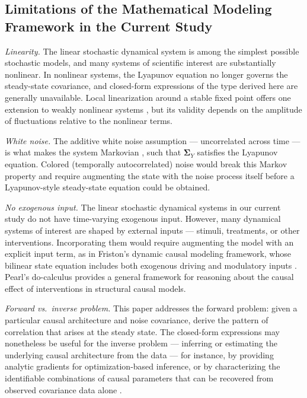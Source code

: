 \documentclass[12pt]{article}
\begin{document}
\subsection*{Limitations of the Mathematical Modeling Framework in the Current Study}

\textit{Linearity.}
The linear stochastic dynamical
system is among the simplest possible
stochastic models, and many systems of scientific interest
are substantially nonlinear.
In nonlinear systems, the Lyapunov
equation no longer governs the
steady-state covariance, and closed-form expressions of the
type derived here are generally unavailable.
Local linearization around a stable fixed point offers one
extension to weakly nonlinear systems \citep{Gardiner2004},
but its validity depends on the amplitude of fluctuations
relative to the nonlinear terms.

\medskip
\textit{White noise.}
The additive white noise assumption --- uncorrelated across
time --- is what makes the system Markovian
\citep{Gardiner2004}, such that
$\mathbf{\Sigma}_Y$ satisfies the Lyapunov equation. Colored (temporally autocorrelated) noise would break this Markov property and require augmenting the state with
the noise process itself before a Lyapunov-style steady-state
equation could be obtained.

\medskip
\textit{No exogenous input.}
The linear stochastic dynamical systems in our current study do not have time-varying exogenous input. However, many dynamical systems of interest are shaped by external inputs ---
stimuli, treatments, or other interventions. Incorporating them would require augmenting the model with an explicit input term, as in Friston's dynamic causal modeling
framework, whose bilinear state equation includes both exogenous
driving and modulatory inputs \citep{FristonHarrisonPenny2003}.
Pearl's do-calculus \citep{Pearl2009} provides a general
framework for reasoning about the causal effect of
interventions in structural causal models.

\medskip
\textit{Forward vs.\ inverse problem.}
This paper addresses the forward problem: given a particular causal architecture and noise covariance, derive the pattern of correlation that arises at the steady state.
The closed-form expressions may nonetheless be useful for
the inverse problem --- inferring or estimating the underlying causal architecture from the data
--- for instance, by providing analytic gradients for
optimization-based inference, or by characterizing the
identifiable combinations of causal parameters that can be
recovered from observed covariance data alone
\citep{VarandoHansen2020, BongersBlomMooij2022}.
\end{document}
